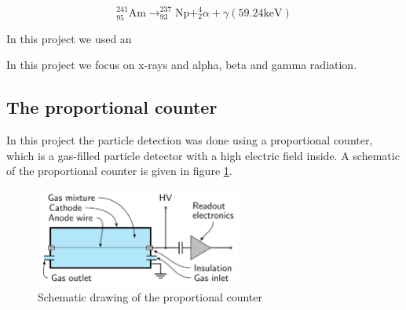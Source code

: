 \documentclass[a4paper]{article}
\begin{document}
\begin{equation}
^{241}_{95}\text{Am} \rightarrow ^{237}_{93}\text{Np} + ^4_2 \alpha + \gamma (59.24 \text{keV})
\end{equation}



In this project we used an

In this project we focus on x-rays and alpha, beta and gamma radiation.




\subsection{The proportional counter}
\label{counter}

In this project the particle detection was done using a proportional counter, which is a gas-filled particle detector with a high electric field inside.
\cite{instructions}
A schematic of the proportional counter is given in figure \ref{fig:theory_schematic}.

\begin{figure}[ht!]
\centering
\includegraphics[width=0.6\textwidth]{fig/article/schematic.png}
\caption{Schematic drawing of the proportional counter \cite{winkler_gaseous_2015}}
\label{fig:theory_schematic}
\end{figure}
\end{document}
